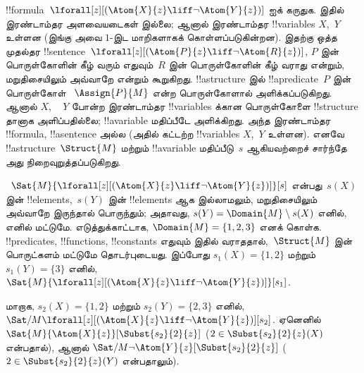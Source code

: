 \documentclass[../../../include/open-logic-section]{subfiles}
\begin{document}
\begin{ex}
  !!{formula}~$\lforall[z][(\Atom{X}{z} \liff \lnot
    \Atom{Y}{z})]$ ஐக் கருதுக. இதில் இரண்டாம்தர அளவையடைகள் இல்லை;
  ஆனால் இரண்டாம்தர !!{variable}s $X$,~$Y$ உள்ளன (இங்கு அவை
  $1$-இட மாறிகளாகக் கொள்ளப்படுகின்றன). இதற்கு ஒத்த முதல்தர
  !!{sentence}~$\lforall[z][(\Atom{P}{z} \liff \lnot \Atom{R}{z})]$,
  $P$ இன் பொருள்கோளின் கீழ் வரும் எதுவும்~$R$ இன் பொருள்கோளின்
  கீழ் வராது என்றும், மறுதிசையிலும் அவ்வாறே என்றும் கூறுகிறது.
  !!a{structure} இல் !!a{predicate}~$P$ இன் பொருள்கோள்
  ~$\Assign{P}{M}$ என்ற பொருள்கோளால் அளிக்கப்படுகிறது. ஆனால் $X$,
  ~ $Y$ போன்ற இரண்டாம்தர !!{variable}s க்கான பொருள்கோளை
  !!{structure} தானாக அளிப்பதில்லை; !!a{variable} மதிப்பீடே
  அளிக்கிறது. அந்த இரண்டாம்தர !!{formula}, !!a{sentence} அல்ல
  (அதில் கட்டற்ற !!{variable}s $X$,~$Y$ உள்ளன). எனவே
  !!a{structure}~$\Struct{M}$ மற்றும் !!a{variable} மதிப்பீடு~$s$
  ஆகியவற்றைச் சார்ந்தே அது நிறைவுறுத்தப்படுகிறது.

  ~$\Sat{M}{\lforall[z][(\Atom{X}{z} \liff \lnot \Atom{Y}{z})]}[s]$
  என்பது~$s(X)$ இன் !!{element}s,~$s(Y)$ இன் !!{element}s ஆக
  இல்லாமலும், மறுதிசையிலும் அவ்வாறே இருந்தால் பொருந்தும்; அதாவது,
  $s(Y) = \Domain{M} \setminus s(X)$ எனில், எனில் மட்டுமே.
  எடுத்துக்காட்டாக, $\Domain{M} = \{1, 2, 3\}$ எனக் கொள்க.
  !!{predicate}s, !!{function}s, !!{constant}s எதுவும் இதில்
  வராததால்,~$\Struct{M}$ இன் பொருட்களம் மட்டுமே தொடர்புடையது.
  இப்போது $s_1(X) = \{1, 2\}$ மற்றும் $s_1(Y) = \{3\}$ எனில்,
  $\Sat{M}{\lforall[z][(\Atom{X}{z}
      \liff \lnot \Atom{Y}{z})]}[s_1]$.

  மாறாக, $s_2(X) = \{1, 2\}$ மற்றும் $s_2(Y) = \{2, 3\}$ எனில்,
  $\Sat/{M}{\lforall[z][(\Atom{X}{z} \liff \lnot
      \Atom{Y}{z})]}[s_2]$. ஏனெனில்
  $\Sat{M}{\Atom{X}{z}}[\Subst{s_2}{2}{z}]$
  ($2 \in \Subst{s_2}{2}{z}(X)$ என்பதால்), ஆனால்
  $\Sat/{M}{\lnot \Atom{Y}{z}}[\Subst{s_2}{2}{z}]$
  ($2 \in \Subst{s_2}{2}{z}(Y)$ என்பதாலும்).
\end{ex}
\end{document}

